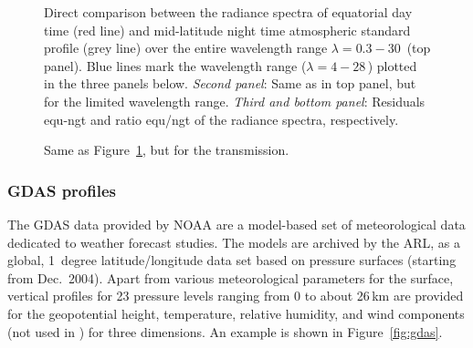 \begin{figure}[ht]
  \begin{center}
    \caption{Direct comparison between the radiance spectra of equatorial day
    time (red line) and mid-latitude night time atmospheric standard profile
    (grey line) over the entire wavelength range $\lambda = 0.3 - 30$\,\mum{}
    (top panel). Blue lines mark the wavelength range
    ($\lambda = 4 - 28$\,\mum) plotted in the three panels below. {\it Second
    panel}: Same as in top panel, but for the limited wavelength range.
    {\it Third and bottom panel}: Residuals equ-ngt and ratio equ/ngt of the
    radiance spectra, respectively.}
    \label{fig:stdcomp_4-28_R}
  \end{center}
\end{figure}
\begin{figure}[ht]
  \begin{center}
    \caption{Same as Figure~\ref{fig:stdcomp_4-28_R}, but for the
    transmission.}
    \label{fig:stdcomp_4-28_T}
  \end{center}
\end{figure}

\clearpage

\subsubsection{GDAS profiles}\label{sec:gdas}
The \ac{GDAS} data provided by \ac{NOAA} are a model-based set of
meteorological data dedicated to weather forecast studies. The models are
archived by the \ac{ARL}, as a global, 1~degree latitude/longitude data set
based on pressure surfaces (starting from Dec.~2004). Apart from various
meteorological parameters for the surface, vertical profiles for 23 pressure
levels ranging from 0 to about 26\,km are provided for the geopotential height,
temperature, relative humidity, and wind components (not used in \mf) for three
dimensions. An example is shown in Figure~\ref{fig:gdas}.

